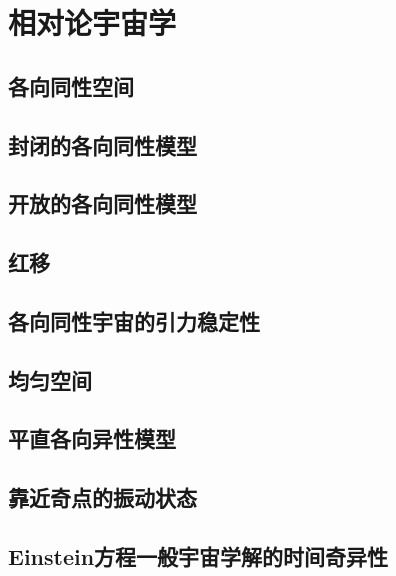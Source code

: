 \chapter{相对论宇宙学}

\section{各向同性空间}

\section{封闭的各向同性模型}

\section{开放的各向同性模型}

\section{红移}

\section{各向同性宇宙的引力稳定性}

\section{均匀空间}

\section{平直各向异性模型}

\section{靠近奇点的振动状态}

\section{Einstein方程一般宇宙学解的时间奇异性}